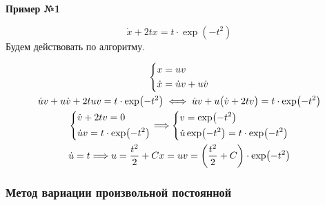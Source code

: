 \documentclass[a4paper,12pt]{article}
\newcommand{\du}{\dot{u}}
\renewcommand{\dv}{\dot{v}}
\newcommand{\dx}{\dot{x}}
\begin{document}
\textbf{Пример №1}

\[\dx +2tx = t\cdot \exp(-t^2)\]
Будем действовать по алгоритму.

\begin{gather*}
	\left\{\begin{gathered}
	x = uv\hfill\\
	\dx = \du v + u\dv\hfill
	\end{gathered}\right.\\
	\du v + u\dv + 2tuv = t\cdot \exp(-t^2) \iff \du v + u\big(\dv + 2tv\big) = t\cdot \exp(-t^2)\\
	\left\{\begin{gathered}
	\dv + 2tv = 0\hfill\\
	\du v = t\cdot \exp(-t^2)\hfill
	\end{gathered}\right. \Longrightarrow
	\left\{\begin{gathered}
	v = \exp(-t^2)\hfill\\
	\du \exp(-t^2) = t\cdot \exp(-t^2)\hfill
	\end{gathered}\right. \\
	\du = t \Longrightarrow u = \dfrac{t^2}{2} + C
	x = uv = \left(\dfrac{t^2}{2} + C\right)\cdot \exp(-t^2)
\end{gather*}

\subsubsection{Метод вариации произвольной постоянной}
\end{document}
